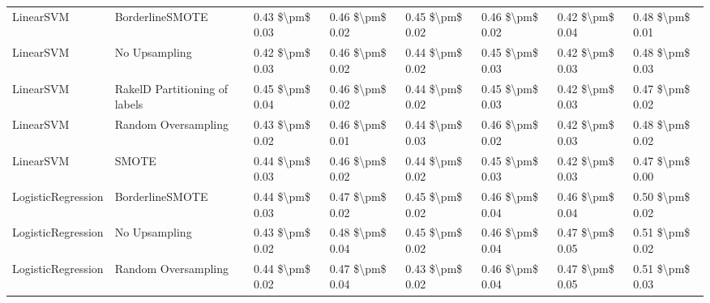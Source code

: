 \begin{tabular}{llllllll}
                      LinearSVM &               BorderlineSMOTE & 0.43 \$\textbackslash pm\$ 0.03 &           0.46 \$\textbackslash pm\$ 0.02 &       0.45 \$\textbackslash pm\$ 0.02 &        0.46 \$\textbackslash pm\$ 0.02 &                         0.42 \$\textbackslash pm\$ 0.04 &     0.48 \$\textbackslash pm\$ 0.01 \\
                      LinearSVM &                 No Upsampling & 0.42 \$\textbackslash pm\$ 0.03 &           0.46 \$\textbackslash pm\$ 0.02 &       0.44 \$\textbackslash pm\$ 0.02 &        0.45 \$\textbackslash pm\$ 0.03 &                         0.42 \$\textbackslash pm\$ 0.03 &     0.48 \$\textbackslash pm\$ 0.03 \\
                      LinearSVM & RakelD Partitioning of labels & 0.45 \$\textbackslash pm\$ 0.04 &           0.46 \$\textbackslash pm\$ 0.02 &       0.44 \$\textbackslash pm\$ 0.02 &        0.45 \$\textbackslash pm\$ 0.03 &                         0.42 \$\textbackslash pm\$ 0.03 &     0.47 \$\textbackslash pm\$ 0.02 \\
                      LinearSVM &           Random Oversampling & 0.43 \$\textbackslash pm\$ 0.02 &           0.46 \$\textbackslash pm\$ 0.01 &       0.44 \$\textbackslash pm\$ 0.03 &        0.46 \$\textbackslash pm\$ 0.02 &                         0.42 \$\textbackslash pm\$ 0.03 &     0.48 \$\textbackslash pm\$ 0.02 \\
                      LinearSVM &                         SMOTE & 0.44 \$\textbackslash pm\$ 0.03 &           0.46 \$\textbackslash pm\$ 0.02 &       0.44 \$\textbackslash pm\$ 0.02 &        0.45 \$\textbackslash pm\$ 0.03 &                         0.42 \$\textbackslash pm\$ 0.03 &     0.47 \$\textbackslash pm\$ 0.00 \\
             LogisticRegression &               BorderlineSMOTE & 0.44 \$\textbackslash pm\$ 0.03 &           0.47 \$\textbackslash pm\$ 0.02 &       0.45 \$\textbackslash pm\$ 0.02 &        0.46 \$\textbackslash pm\$ 0.04 &                         0.46 \$\textbackslash pm\$ 0.04 &     0.50 \$\textbackslash pm\$ 0.02 \\
             LogisticRegression &                 No Upsampling & 0.43 \$\textbackslash pm\$ 0.02 &           0.48 \$\textbackslash pm\$ 0.04 &       0.45 \$\textbackslash pm\$ 0.02 &        0.46 \$\textbackslash pm\$ 0.04 &                         0.47 \$\textbackslash pm\$ 0.05 &     0.51 \$\textbackslash pm\$ 0.02 \\
             LogisticRegression &           Random Oversampling & 0.44 \$\textbackslash pm\$ 0.02 &           0.47 \$\textbackslash pm\$ 0.04 &       0.43 \$\textbackslash pm\$ 0.02 &        0.46 \$\textbackslash pm\$ 0.04 &                         0.47 \$\textbackslash pm\$ 0.05 &     0.51 \$\textbackslash pm\$ 0.03 \\

\end{tabular}
